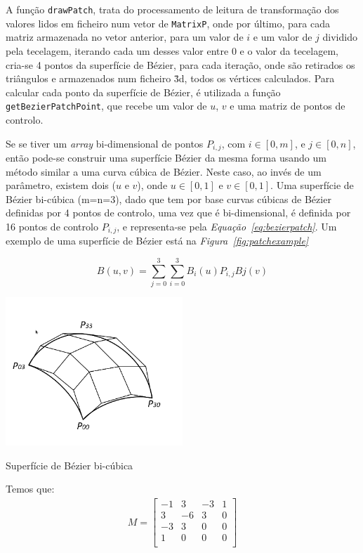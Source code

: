 A função \texttt{drawPatch}, trata do processamento de leitura de transformação
dos valores lidos em ficheiro num vetor de \texttt{MatrixP}, onde por último,
para cada matriz armazenada no vetor anterior, para um valor de $i$ e um valor
de $j$ dividido pela tecelagem, iterando cada um desses valor entre 0 e o valor
da tecelagem, cria-se 4 pontos da superfície de Bézier, para cada iteração, onde
são retirados os triângulos e armazenados num ficheiro \.3d, todos os vértices
calculados.  Para calcular cada ponto da superfície de Bézier, é utilizada
a função \texttt{getBezierPatchPoint}, que recebe um valor de $u$, $v$ e uma
matriz de pontos de controlo. 

\newpage

Se se tiver um \emph{array} bi-dimensional de pontos
$P_{i,j}$, com $i\in[0, m]$, e $j\in[0,n]$, então pode-se
construir uma superfície Bézier da mesma forma usando um método similar a uma
curva cúbica de Bézier. Neste caso, ao invés de um parâmetro, existem dois
($u$ e $v$), onde $u\in[0,1]$ e $v\in[0,1]$.
Uma superfície de Bézier bi-cúbica (m=n=3), dado que tem por base curvas cúbicas
de Bézier definidas por 4 pontos de controlo, uma vez que é bi-dimensional, é definida por 16 pontos de
controlo $P_{i,j}$, e  representa-se pela \emph{Equação~\ref{eq:bezierpatch}}. Um
exemplo de uma superfície de Bézier está na \emph{Figura~\ref{fig:patchexample}} 

\begin{equation}
B(u,v)=\sum_{j=0}^{3}\sum_{i=0}^{3}B_{i}(u)P_{i,j}B{j}(v)
\label{eq:bezierpatch}
\end{equation}



\begin{center}
 	
 	\includegraphics[width=0.5\textwidth,height=0.5\textheight,keepaspectratio]{resources/beziersupf.png}
 	\captionsetup{type=figure, width=0.8\linewidth}
	\caption{Superfície de Bézier bi-cúbica}
\label{fig:patchexample} 
\end{center}
Temos que:
\begin{gather*}
M = \begin{bmatrix}
-1 &  3 & -3 & 1  \\
 3 & -6 & 3  & 0  \\
-3 &  3 & 0  & 0  \\
1  &  0 & 0  & 0  \\
\end{bmatrix}
\end{gather*}

